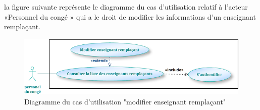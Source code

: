 \documentclass[12 pt]{report}
\begin{document}
la figure suivante représente le diagramme du cas d’utilisation  relatif à l’acteur «Personnel du congé » qui a le droit de modifier les informations d'un enseignant remplaçant.
\begin{figure}[h]
 \begin{center}
\includegraphics[width=13 cm ,height= 3.8 cm]{mod_ens_remp.PNG}
\caption{Diagramme du cas d’utilisation "modifier enseignant remplaçant"}
\end{center}
\end{figure}
\end{document}
